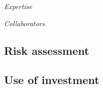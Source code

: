 \documentclass[a4paper,10pt,fleqn]{application}
\begin{document}
\textit{Expertise}

\textit{Collaborators}

\subsection{Risk assessment}

\subsection{Use of investment}
\end{document}
